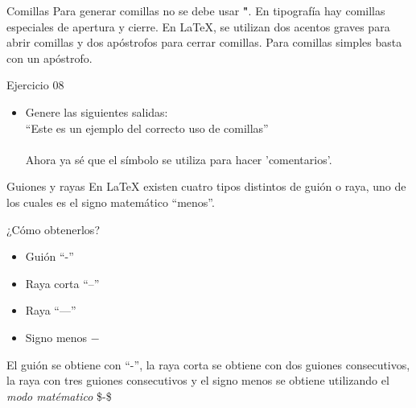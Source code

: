 \documentclass[10pt]{beamer}
\begin{document}
\begin{frame}{Comillas}
Para generar comillas no se debe usar \textbf{"}. En tipografía hay comillas especiales de apertura y cierre. En \LaTeX{}, se utilizan dos acentos graves para abrir comillas y dos apóstrofos para cerrar comillas. Para comillas simples basta con un apóstrofo.

\begin{exampleblock}{Ejercicio 08}
	\begin{itemize}
		\item Genere las siguientes salidas: \\
		``Este es un ejemplo del correcto uso de comillas'' \\
		\\
		Ahora ya sé que el símbolo  se utiliza para hacer 'comentarios'. 	
	\end{itemize}
\end{exampleblock}
\end{frame}

\begin{frame}{Guiones y rayas}
En \LaTeX{} existen cuatro tipos distintos de guión o raya, uno de los cuales es el signo matemático ``menos''.

\begin{block}{¿Cómo obtenerlos?}
\begin{itemize}
	\item Guión ``-''
	\item Raya corta ``--''
	\item Raya ``---''
	\item Signo menos $-$
\end{itemize}

El guión se obtiene con ``-'', la raya corta se obtiene con dos guiones consecutivos, la raya con tres guiones consecutivos y el signo menos se obtiene utilizando el \emph{modo matématico} \$-\$
\end{block}
\end{frame}
\end{document}
